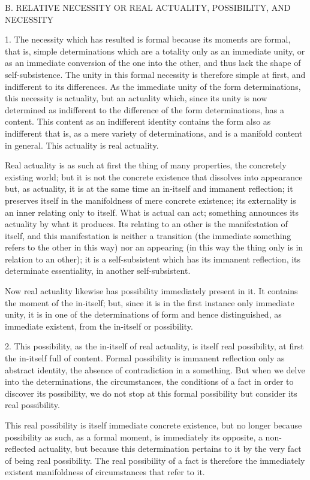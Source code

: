 B. RELATIVE NECESSITY OR REAL ACTUALITY, POSSIBILITY, AND NECESSITY

1. The necessity which has resulted is formal
because its moments are formal,
that is, simple determinations which are a totality
only as an immediate unity,
or as an immediate conversion of the one into the other,
and thus lack the shape of self-subsistence.
The unity in this formal necessity is therefore simple at first,
and indifferent to its differences.
As the immediate unity of the form determinations,
this necessity is actuality,
but an actuality which, since its unity is now determined as indifferent
to the difference of the form determinations, has a content.
This content as an indifferent identity contains the form
also as indifferent that is, as a mere variety of determinations,
and is a manifold content in general.
This actuality is real actuality.

Real actuality is as such at first
the thing of many properties,
the concretely existing world;
but it is not the concrete existence
that dissolves into appearance
but, as actuality, it is at the same time
an in-itself and immanent reflection;
it preserves itself in the manifoldness of mere concrete existence;
its externality is an inner relating only to itself.
What is actual can act;
something announces its actuality by what it produces.
Its relating to an other is the manifestation of itself,
and this manifestation is
neither a transition
(the immediate something refers to the other in this way)
nor an appearing
(in this way the thing only is in relation to an other);
it is a self-subsistent which has its immanent reflection,
its determinate essentiality, in another self-subsistent.

Now real actuality likewise has possibility immediately present in it.
It contains the moment of the in-itself;
but, since it is in the first instance only immediate unity,
it is in one of the determinations of form
and hence distinguished, as immediate existent,
from the in-itself or possibility.

2. This possibility, as the in-itself of real actuality,
is itself real possibility, at first the in-itself full of content.
Formal possibility is immanent reflection only as abstract identity,
the absence of contradiction in a something.
But when we delve into the determinations,
the circumstances, the conditions of a fact
in order to discover its possibility,
we do not stop at this formal possibility
but consider its real possibility.

This real possibility is itself immediate concrete existence,
but no longer because possibility as such, as a formal moment,
is immediately its opposite, a non-reflected actuality,
but because this determination pertains to it
by the very fact of being real possibility.
The real possibility of a fact is therefore
the immediately existent manifoldness of
circumstances that refer to it.


